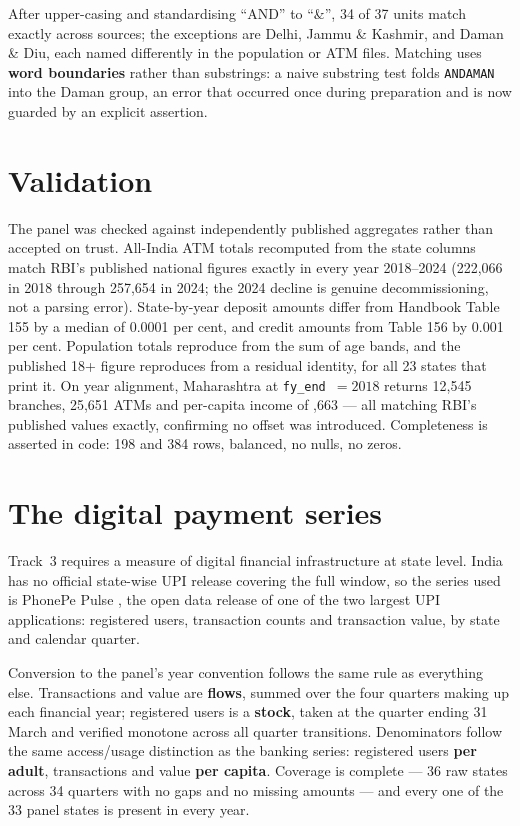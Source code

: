 \noindent
After upper-casing and standardising ``AND'' to ``\&'', 34 of 37 units match exactly across
sources; the exceptions are Delhi, Jammu \& Kashmir, and Daman \& Diu, each named differently in
the population or ATM files. Matching uses \textbf{word boundaries} rather than substrings: a naive
substring test folds \texttt{ANDAMAN} into the Daman group, an error that occurred once during
preparation and is now guarded by an explicit assertion.

\section{Validation}
\label{sec:data-validation}

The panel was checked against independently published aggregates rather than accepted on trust.
All-India ATM totals recomputed from the state columns match RBI's published national figures
exactly in every year 2018--2024 (222,066 in 2018 through 257,654 in 2024; the 2024 decline is
genuine decommissioning, not a parsing error). State-by-year deposit amounts differ from Handbook
Table 155 by a median of 0.0001 per cent, and credit amounts from Table 156 by 0.001 per cent.
Population totals reproduce from the sum of age bands, and the published 18+ figure reproduces from
a residual identity, for all 23 states that print it. On year alignment, Maharashtra at
\texttt{fy\_end}~$=2018$ returns 12,545 branches, 25,651 ATMs and per-capita income of
,663 --- all matching RBI's published values exactly, confirming no offset was introduced.
Completeness is asserted in code: 198 and 384 rows, balanced, no nulls, no zeros.

\section{The digital payment series}
\label{sec:data-digital}

Track~3 requires a measure of digital financial infrastructure at state level. India has no
official state-wise UPI release covering the full window, so the series used is PhonePe Pulse
\citep{phonepepulse}, the open data release of one of the two largest UPI applications: registered
users, transaction counts and transaction value, by state and calendar quarter.

Conversion to the panel's year convention follows the same rule as everything else. Transactions
and value are \textbf{flows}, summed over the four quarters making up each financial year;
registered users is a \textbf{stock}, taken at the quarter ending 31 March and verified monotone
across all quarter transitions. Denominators follow the same access/usage distinction as the
banking series: registered users \textbf{per adult}, transactions and value \textbf{per capita}.
Coverage is complete --- 36 raw states across 34 quarters with no gaps and no missing amounts ---
and every one of the 33 panel states is present in every year.

